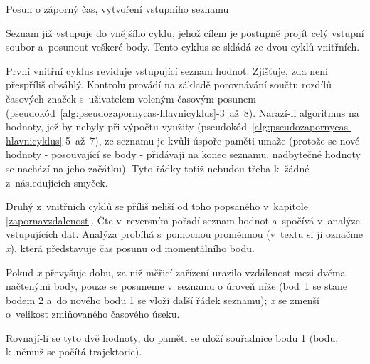 \begin{algorithm}
    \caption{Posun o záporný čas, vytvoření vstupního seznamu}
    \label{alg:pseudozapornycas-vstup}
    \begin{algorithmic}[1]
    \ENDWHILE
    \end{algorithmic}
\end{algorithm}

Seznam již vstupuje do vnějšího cyklu, jehož cílem je postupně projít celý vstupní
soubor a~posunout veškeré body. Tento cyklus se skládá ze dvou cyklů vnitřních. 

První vnitřní cyklus reviduje vstupující seznam hodnot. Zjišťuje, zda není přes\-příliš obsáhlý.
Kontrolu provádí na základě porovnávání součtu rozdílů časových značek s~uživatelem
voleným časovým posunem (pseudokód~\ref{alg:pseudozapornycas-hlavnicyklus}-3~až~8).
Narazí-li algoritmus na hodnoty, jež by nebyly při výpočtu využity
(pseudokód~\ref{alg:pseudozapornycas-hlavnicyklus}-5~až~7), ze seznamu je kvůli úspoře
paměti umaže (protože se nové hodnoty - posouvající se body - přidávají
na konec seznamu, nadbytečné hodnoty se nachází na jeho začátku). Tyto řádky totiž nebudou
třeba k~žádné z~následujících smyček. 

Druhý z~vnitřních cyklů se příliš neliší od toho popsaného v~kapitole \ref{zapornavzdalenost}.
Čte v~reversním pořadí seznam hodnot a~spočívá v~analýze vstupujících dat. Analýza
probíhá s~pomocnou proměnnou (v~textu si ji označme
\textit{x}), která představuje čas posunu od momentálního bodu. 

Pokud \textit{x} převyšuje dobu, za niž měřicí zařízení urazilo vzdálenost mezi dvěma načtenými
body, pouze se posuneme v~seznamu o úroveň níže (bod~1 se stane bodem 2 a~do nového
bodu 1 se vloží další řádek seznamu); \textit{x} se zmenší o~velikost zmiňovaného časového úseku. 

Rovnají-li se tyto dvě hodnoty, do paměti se uloží
souřadnice bodu 1 (bodu, k~němuž se počítá trajektorie). 

